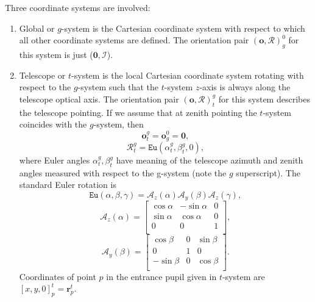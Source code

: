 Three coordinate systems are involved:
\begin{enumerate}
	\item Global or $g$-system is the Cartesian coordinate system with respect
	to which all other coordinate systems are defined. The orientation pair
	$(\bm{o},\mathcal{R})_{g}^{0}$ for this system is just ($\bm{0},\mathcal{I}$).
	\item Telescope or $t$-system is the local Cartesian coordinate system
	rotating with respect to the $g$-system such that the $t$-system $z$-axis is
	always along the telescope optical axis. The orientation pair
	$(\bm{o},\mathcal{R})_{t}^{g}$ for this system describes the telescope
	pointing. If we assume that at zenith pointing the $t$-system coincides with
	the $g$-system, then \\
	\begin{equation} \label{eq:t-origin}
		\bm{o}^{g}_{t} = \bm{o}^{0}_{g} = \bm{0},
	\end{equation}
	\begin{equation} \label{eq:t-rotation}
		\mathcal{R}^{g}_{t} = \texttt{Eu}(\alpha^{g}_{t},\beta^{g}_{t},0),
	\end{equation}
	where Euler angles $\alpha^{g}_{t},\beta^{g}_{t}$ have meaning of the
	telescope azimuth and zenith angles measured with respect to the g-system
	(note the $g$ superscript). The standard Euler rotation is
	\begin{equation} \label{Euler}
		\texttt{Eu}(\alpha,\beta,\gamma) = \mathcal{A}_{z}(\alpha)
		                                   \mathcal{A}_{y}(\beta)
		                                   \mathcal{A}_{z}(\gamma),
	\end{equation}
	$$ \mathcal{A}_{z}(\alpha) = \left[
     \begin{array}{crc}
	     \cos{\alpha} & -\sin{\alpha} & 0 \\
	     \sin{\alpha} & \cos{\alpha} & 0 \\
	     0 & 0 & 1 \\
		 \end{array} \right],
	$$
	$$ \mathcal{A}_{y}(\beta) = \left[
     \begin{array}{rcc}
	     \cos{\beta} & 0 & \sin{\beta} \\
	     0 & 1 & 0 \\
	     -\sin{\beta} & 0 & \cos{\beta} \\
		 \end{array} \right].
	$$
	Coordinates of point $p$ in the entrance pupil given in $t$-system are
	$[x,y,0]_{p}^{t} = \bm{r}_{p}^{t}$.

\end{enumerate}

